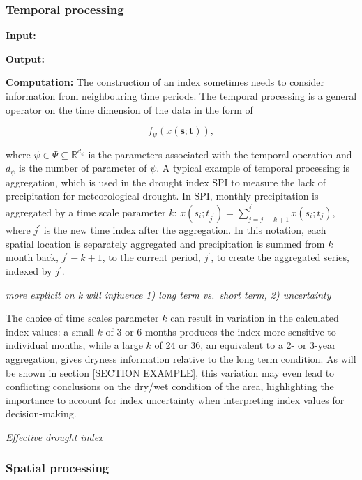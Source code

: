\documentclass[
]{interact}
\begin{document}
\hypertarget{temporal-processing}{%
\subsubsection{Temporal processing}\label{temporal-processing}}

\textbf{Input: }

\textbf{Output: }

\textbf{Computation:} The construction of an index sometimes needs to
consider information from neighbouring time periods. The temporal
processing is a general operator on the time dimension of the data in
the form of

\begin{equation}
f_{\mathcal{\psi}}(x(\mathbf{s};\mathbf{t})),
\end{equation}

where \(\psi \in \Psi \subseteq \mathbb{R}^{d_{\psi}}\) is the
parameters associated with the temporal operation and \(d_{\psi}\) is
the number of parameter of \(\psi\). A typical example of temporal
processing is aggregation, which is used in the drought index SPI to
measure the lack of precipitation for meteorological drought. In SPI,
monthly precipitation is aggregated by a time scale parameter \(k\):
\(x(s_i;t_{j^\prime}) = \sum_{j = j^\prime-k+1}^{j^\prime}x(s_i; t_j),\)
where \(j^\prime\) is the new time index after the aggregation. In this
notation, each spatial location is separately aggregated and
precipitation is summed from \(k\) month back, \(j^\prime - k + 1\), to
the current period, \(j^\prime\), to create the aggregated series,
indexed by \(j^\prime\).

\emph{more explicit on k will influence 1) long term vs.~short term, 2)
uncertainty}

The choice of time scales parameter \(k\) can result in variation in the
calculated index values: a small \(k\) of 3 or 6 months produces the
index more sensitive to individual months, while a large \(k\) of 24 or
36, an equivalent to a 2- or 3-year aggregation, gives dryness
information relative to the long term condition. As will be shown in
section {[}SECTION EXAMPLE{]}, this variation may even lead to
conflicting conclusions on the dry/wet condition of the area,
highlighting the importance to account for index uncertainty when
interpreting index values for decision-making.

\emph{Effective drought index}

\hypertarget{spatial-processing}{%
\subsubsection{Spatial processing}\label{spatial-processing}}
\end{document}
